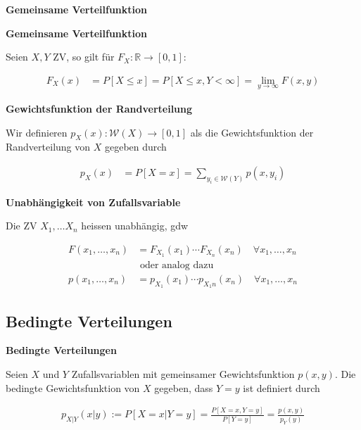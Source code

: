 \documentclass[25pt]{sciposter}
\newcommand{\R}{\mathbb{R}}
\newcommand{\W}{\mathcal{W}}
\newenvironment{method}[1]{\begin{mdframed}[backgroundcolor=blue!10,innertopmargin=15pt, innerbottommargin=15pt,nobreak=true]
		\textbf{#1 }
	}
	{ 
	\end{mdframed}
}
\begin{document}
\begin{multicols}{3}
\begin{method}{Gemeinsame Verteilfunktion}
			
		\end{method}
		
		\begin{method}{Gemeinsame Verteilfunktion}
			Seien $X,Y$ ZV, so gilt für $F_X : \R \to [0,1]$:
			
			\begin{align*}
				F_X(x) &= P[X \leq x] = P[X \leq x , Y < \infty] = \lim\limits_{y\to\infty} F(x,y)
			\end{align*}
		\end{method}
		
		\begin{method}{Gewichtsfunktion der Randverteilung}
			Wir definieren $p_X(x) : \W(X) \to [0,1]$ als die Gewichtsfunktion der Randverteilung von $X$ gegeben durch 
			
			\begin{align*}
				p_X(x) &= P[X=x] = \sum_{y_i\in \W(Y)} p(x,y_i)
			\end{align*}
			
		\end{method}
		
		
		\begin{method}{Unabhängigkeit von Zufallsvariable}
			Die ZV $X_1, \ldots X_n$ heissen unabhängig, gdw 
			
			\begin{align*}
				F(x_1, \ldots, x_n) &= F_{X_1}(x_1) \cdots F_{X_n}(x_n) \quad \forall x_1,\ldots,x_n\\
				&\text{ oder analog dazu}\\
				p(x_1,\ldots, x_n) &= p_{X_1}(x_1)\cdots p_{X_1n}(x_n) \quad \forall x_1,\ldots,x_n
			\end{align*}
			
			
			
			
		\end{method}
		
		
		
		\subsection*{Bedingte Verteilungen}
		
		\begin{method}{Bedingte Verteilungen}
			Seien $X$ und $Y$ Zufallsvariablen mit gemeinsamer Gewichtsfunktion $p(x,y)$. Die bedingte Gewichtsfunktion von $X$ gegeben, dass $Y = y$ ist definiert durch
			
			\begin{align*}
				p_{X|Y} (x|y) := P[X=x | Y=y] = \frac{P[X=x, Y=y]}{P[Y=y]} = \frac{p(x,y)}{p_Y(y)}
			\end{align*}
		\end{method}
		

\end{multicols}
\end{document}
